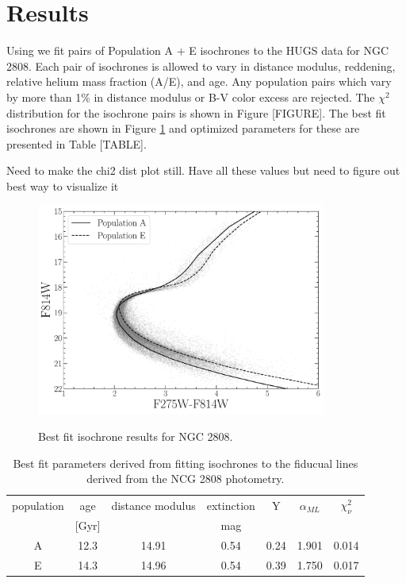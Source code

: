 \section{Results}\label{sec:results}
Using \fidanka we fit pairs of Population A + E isochrones to the HUGS data for
NGC 2808. Each pair of isochrones is allowed to vary in distance modulus,
reddening, relative helium mass fraction (A/E), and age. Any population pairs which vary by more than 1\% in distance modulus or B-V color excess are rejected. The $\chi^{2}$
distribution for the isochrone pairs is shown in Figure {\color{red}[FIGURE]}.
The best fit isochrones are shown in Figure \ref{fig:BestFitResults} and optimized
parameters for these are presented in Table {\color{red}[TABLE]}.

{\color{red} Need to make the chi2 dist plot still. Have all these values but need to figure out best way to visualize it}

\begin{figure}
  \centering
  \includegraphics[width=0.85\textwidth]{figures/ngc2808/BestFitResults.pdf}
  \label{fig:BestFitResults}
  \caption{Best fit isochrone results for NGC 2808.}
\end{figure}

\begin{table}
  \centering
  \begin{tabular}{c | c c c c c c}
    \hline
    population & age & distance modulus & extinction & Y & $\alpha_{ML}$ & $\chi^{2}_{\nu}$\\
    & [Gyr] & & mag & & &\\
    \hline
    \hline
    A & 12.3 & 14.91 & 0.54 & 0.24 & 1.901 & 0.014\\
    E & 14.3 & 14.96 & 0.54 & 0.39 & 1.750 & 0.017 \\
    \hline
  \end{tabular}
  \label{tab:BestFitResults}
  \caption{Best fit parameters derived from fitting isochrones to the fiducual lines derived from the NCG 2808 photometry.}
\end{table}

